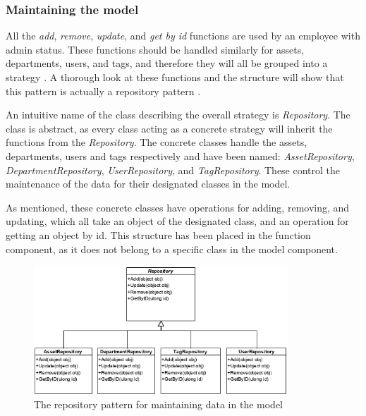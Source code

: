 \subsubsection{Maintaining the model}
All the \textit{add}, \textit{remove}, \textit{update}, and \textit{get by id} functions are used by an employee with admin status. These functions should be handled similarly for assets, departments, users, and tags, and therefore they will all be grouped into a strategy \citep{OOAD}. A thorough look at these functions and the structure will show that this pattern is actually a repository pattern \citep{RepositoryPatternDescription}.
\par
An intuitive name of the class describing the overall strategy is \textit{Repository}. The class is abstract, as every class acting as a concrete strategy will inherit the functions from the \textit{Repository}. The concrete classes handle the assets, departments, users and tags respectively and have been named: \textit{AssetRepository}, \textit{DepartmentRepository}, \textit{UserRepository}, and \textit{TagRepository}. These control the maintenance of the data for their designated classes in the model.
\par
As mentioned, these concrete classes have operations for adding, removing, and updating, which all take an object of the designated class, and an operation for getting an object by id. This structure has been placed in the function component, as it does not belong to a specific class in the model component. 
\begin{figure}[H]
    \centering
    \includegraphics[width=0.85\textwidth]{figures/FunctionComponent/Repository_pattern.png}
    \caption{The repository pattern for maintaining data in the model}
    \label{fig:RepositoryPattern}
\end{figure}


